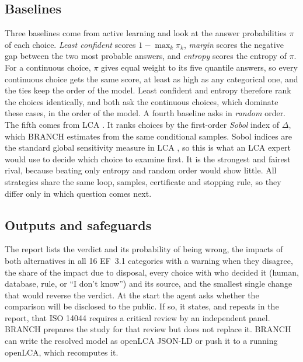 \documentclass{article}
\begin{document}
\subsection{Baselines}

Three baselines come from active learning \citep{settles2009} and look at the answer probabilities
$\pi$ of each choice. \emph{Least confident} scores $1-\max_k \pi_k$, \emph{margin} scores the negative gap
between the two most probable answers, and \emph{entropy} scores the entropy of $\pi$. For a continuous
choice, $\pi$ gives equal weight to its five quantile answers, so every continuous choice gets the same
score, at least as high as any categorical one, and the ties keep the order of the model. Least confident and
entropy therefore rank the choices identically, and both ask the continuous choices, which dominate
these cases, in the order of the model. A fourth baseline asks in \emph{random} order. The fifth
comes from LCA \citep{saltelli2008,groen2017}. It ranks choices by the first-order \emph{Sobol} index of
$\Delta$, which BRANCH estimates from the same conditional samples. Sobol indices are the standard
global sensitivity measure in LCA \citep{groen2017}, so this is what an LCA expert would use to decide
which choice to examine first. It is the strongest and fairest rival, because beating only entropy and
random order would show little. All strategies share the same loop,
samples, certificate and stopping rule, so they differ only in which question comes next.

\subsection{Outputs and safeguards}

The report lists the verdict and its probability of being wrong, the impacts of both alternatives in all
16 EF~3.1 categories with a warning when they disagree, the share of the impact due to disposal, every
choice with who decided it (human, database, rule, or ``I don't know'') and its source, and the smallest
single change that would reverse the verdict. At the start the agent asks whether the comparison will be
disclosed to the public. If so, it states, and repeats in the report, that ISO 14044 requires a critical
review by an independent panel. BRANCH prepares the study for that review but does not replace it. BRANCH
can write the resolved model as openLCA JSON-LD or push it to a running openLCA, which recomputes it.

\end{document}
